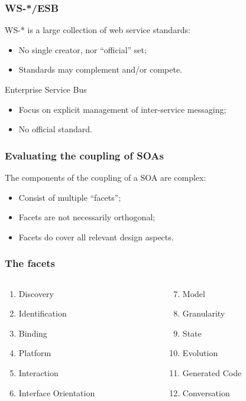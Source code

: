 \documentclass{beamer}
\begin{document}
\begin{frame}
    \frametitle{WS-*/ESB}
    WS-* is a large collection of web service standards:
    \begin{itemize}
        \item No single creator, nor ``official'' set;
        \item Standards may complement and/or compete.
    \end{itemize}
    Enterprise Service Bus
    \begin{itemize}
        \item Focus on explicit management of inter-service messaging;
        \item No official standard.
    \end{itemize}
\end{frame}

\begin{frame}
    \frametitle{Evaluating the coupling of SOAs}
    The components of the coupling of a SOA are complex:
    \begin{itemize}
        \item Consist of multiple ``facets'';
        \item Facets are not necessarily orthogonal;
        \item Facets do cover all relevant design aspects.
    \end{itemize}
\end{frame}

\begin{frame}
    \frametitle{The facets}
    \begin{columns}[T]
      \begin{column}{.5\linewidth}
        \begin{enumerate}
            \item{Discovery}
            \item{Identification}
            \item{Binding}
            \item{Platform}
            \item{Interaction}
            \item{Interface Orientation}
        \end{enumerate}
      \end{column}
      \begin{column}{.5\linewidth}
        \begin{enumerate}
          \setcounter{enumi}{6}
            \item{Model}
            \item{Granularity}
            \item{State}
            \item{Evolution}
            \item{Generated Code}
            \item{Conversation}
        \end{enumerate}
      \end{column}
   \end{columns}
\end{frame}
\end{document}
